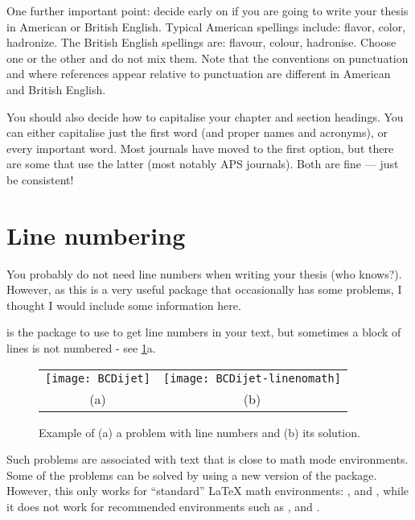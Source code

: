 One further important point: decide early on if you are going to write your thesis in American or British English.
Typical American spellings include: flavor, color, hadronize.
The British English spellings are: flavour, colour, hadronise.
Choose one or the other and do not mix them.
Note that the conventions on punctuation and where references appear relative to punctuation
are different in American and British English.

You should also decide how to capitalise your chapter and section headings.
You can either capitalise just the first word (and proper names and acronyms),
or every important word.
Most journals have moved to the first option,
but there are some that use the latter (most notably APS journals).
Both are fine --- just be consistent!

\section{Line numbering}
\label{sec:tips:lineno}

You probably do not need line numbers when writing your
thesis (who knows?). However, as this is a very useful package that
occasionally has some problems, I thought I would include some
information here.

 is the package to use to get line numbers in your text,
but sometimes a block of lines is not numbered - see \cref{fig:lineno}a.

\begin{figure}[htbp]
  \centering
  \begin{tabular}{cc}
  \texttt{[image: BCDijet]} &
  \texttt{[image: BCDijet-linenomath]}\\
  (a) & (b)
  \end{tabular}
  \caption{Example of (a) a problem with line numbers and (b) its solution.}
  \label{fig:lineno}
\end{figure}

Such problems are associated with text that is close to math mode
environments. Some of the problems can be solved by using a new
version of the  package.
However, this only works for \enquote{standard} \LaTeX{}
math environments: ,  and , while it does
not work for recommended  environments such as ,
 and .

